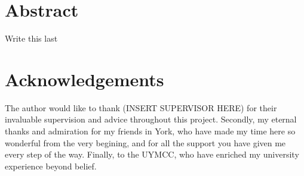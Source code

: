 \documentclass[11pt]{report}
\begin{document}


\section*{Abstract}
Write this last

\section*{Acknowledgements}
The author would like to thank (INSERT SUPERVISOR HERE) for their invaluable supervision and advice throughout this project. Secondly, my eternal thanks and admiration for my friends in York, who have made my time here so wonderful from the very begining, and for all the support you have given me every step of the way. Finally, to the UYMCC, who have enriched my university experience beyond belief. 

\tableofcontents



{}

\end{document}
